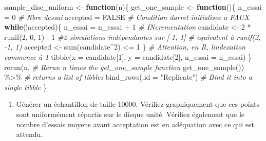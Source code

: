 \documentclass[
]{article}
\newenvironment{Shaded}{\begin{snugshade}}{\end{snugshade}}
\newcommand{\AttributeTok}[1]{\textcolor[rgb]{0.77,0.63,0.00}{#1}}
\newcommand{\CommentTok}[1]{\textcolor[rgb]{0.56,0.35,0.01}{\textit{#1}}}
\newcommand{\ConstantTok}[1]{\textcolor[rgb]{0.00,0.00,0.00}{#1}}
\newcommand{\ControlFlowTok}[1]{\textcolor[rgb]{0.13,0.29,0.53}{\textbf{#1}}}
\newcommand{\DecValTok}[1]{\textcolor[rgb]{0.00,0.00,0.81}{#1}}
\newcommand{\FunctionTok}[1]{\textcolor[rgb]{0.00,0.00,0.00}{#1}}
\newcommand{\NormalTok}[1]{#1}
\newcommand{\OtherTok}[1]{\textcolor[rgb]{0.56,0.35,0.01}{#1}}
\newcommand{\SpecialCharTok}[1]{\textcolor[rgb]{0.00,0.00,0.00}{#1}}
\newcommand{\StringTok}[1]{\textcolor[rgb]{0.31,0.60,0.02}{#1}}
\providecommand{\tightlist}{%
  \setlength{\itemsep}{0pt}\setlength{\parskip}{0pt}}
\begin{document}
\begin{Shaded}
\begin{Highlighting}[]
\NormalTok{sample\_disc\_uniform }\OtherTok{\textless{}{-}} \ControlFlowTok{function}\NormalTok{(n)\{}
\NormalTok{  get\_one\_sample }\OtherTok{\textless{}{-}} \ControlFlowTok{function}\NormalTok{()\{}
\NormalTok{    n\_essai }\OtherTok{=} \DecValTok{0} \CommentTok{\# Nbre d\textquotesingle{}essai}
\NormalTok{    accepted }\OtherTok{=} \ConstantTok{FALSE} \CommentTok{\# Condition d\textquotesingle{}arret initialisee a FAUX}
    \ControlFlowTok{while}\NormalTok{(}\SpecialCharTok{!}\NormalTok{accepted)\{}
\NormalTok{      n\_essai }\OtherTok{=}\NormalTok{ n\_essai }\SpecialCharTok{+} \DecValTok{1} \CommentTok{\# INcrementation}
\NormalTok{      candidate }\OtherTok{\textless{}{-}} \DecValTok{2} \SpecialCharTok{*} \FunctionTok{runif}\NormalTok{(}\DecValTok{2}\NormalTok{, }\DecValTok{0}\NormalTok{, }\DecValTok{1}\NormalTok{) }\SpecialCharTok{{-}} \DecValTok{1} \CommentTok{\#2 simulations indépendantes sur [{-}1, 1]}
      \CommentTok{\# equivalent à runif(2, {-}1, 1)}
\NormalTok{      accepted }\OtherTok{\textless{}{-}} \FunctionTok{sum}\NormalTok{(candidate}\SpecialCharTok{\^{}}\DecValTok{2}\NormalTok{) }\SpecialCharTok{\textless{}=} \DecValTok{1}
\NormalTok{    \}}
    \CommentTok{\# Attention, en R, l\textquotesingle{}indexation commence à 1}
    \FunctionTok{tibble}\NormalTok{(}\AttributeTok{x =}\NormalTok{ candidate[}\DecValTok{1}\NormalTok{], }\AttributeTok{y =}\NormalTok{ candidate[}\DecValTok{2}\NormalTok{], }\AttributeTok{n\_essai =}\NormalTok{ n\_essai)}
\NormalTok{  \}}
  \FunctionTok{rerun}\NormalTok{(n, }\CommentTok{\# Rerun n times the get\_one\_sample function}
        \FunctionTok{get\_one\_sample}\NormalTok{()) }\SpecialCharTok{\%\textgreater{}\%} \CommentTok{\# returns a list of tibbles}
    \FunctionTok{bind\_rows}\NormalTok{(}\AttributeTok{.id =} \StringTok{"Replicate"}\NormalTok{) }\CommentTok{\# Bind it into a single tibble}
\NormalTok{\}}
\end{Highlighting}
\end{Shaded}

\begin{enumerate}
\def\labelenumi{\arabic{enumi}.}
\setcounter{enumi}{4}
\tightlist
\item
  Générer un échantillon de taille 10000. Vérifiez graphiquement que ces
  points sont uniformément répartis sur le disque unité. Vérifiez
  également que le nombre d'essais moyens avant acceptation est en
  adéquation avec ce qui est attendu.
\end{enumerate}
\end{document}
